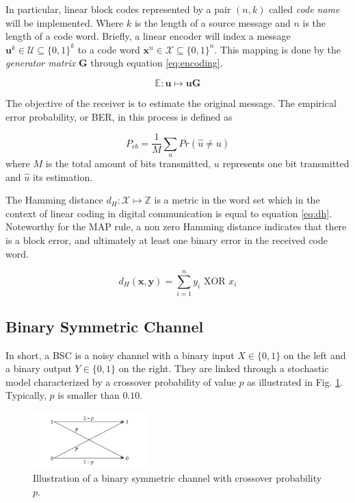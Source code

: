 \documentclass[conference]{IEEEtran}
\begin{document}
In particular, linear block codes represented by a pair $(n, k)$ called \textit{code name} will be implemented. Where $k$ is the length of a source message and $n$ is the length of a code word. Briefly, a linear encoder will index a message $\textbf{u}^k \in \mathcal{U} \subseteq \{0,1\}^k$ to a code word $\textbf{x}^n \in \mathcal{X} \subseteq \{0,1\}^n$. This mapping is done by the \textit{generator matrix} $ \textbf{G} $ through equation \eqref{eq:encoding}.

\begin{equation}\label{eq:encoding}
\mathbb{E}:\textbf{u} \mapsto \textbf{uG}
\end{equation}

The objective of the receiver is to estimate the original message. The empirical error probability, or BER, in this process is defined as

\begin{equation}
P_{eb} = \frac{1}{M} \underset{u}{\sum}Pr(\hat{u}\neq u)
\end{equation}
where $M$ is the total amount of bits transmitted, $u$ represents one bit transmitted and $\hat{u}$ its estimation.

The Hamming distance $d_H:\mathcal{X}\mapsto \mathbb{Z}$ is a metric in the word set which in the context of linear coding in digital communication is equal to equation \eqref{eq:dh}. Noteworthy for the MAP rule, a non zero Hamming distance indicates that there is a block error, and ultimately at least one binary error in the received code word.

\begin{equation}\label{eq:dh}
d_H(\textbf{x},\textbf{y}) = \sum_{i=1}^{n} y_i \text{ XOR } x_i 
\end{equation}  

\subsection{Binary Symmetric Channel}

In short, a BSC is a noisy channel with a binary input $X\in \{0,1\}$ on the left and a binary output $Y\in \{0,1\}$ on the right. They are linked through a stochastic model characterized by a crossover probability of value $p$ as illustrated in Fig. \ref{fig:BSC}. Typically, $p$ is smaller than $0.10$.


\begin{figure}[!ht]
  \centering
    \includegraphics[width=0.4\textwidth]{images/BSC}
    \caption{Illustration of a binary symmetric channel with crossover probability $p$.}\label{fig:BSC}
\end{figure}
\end{document}
